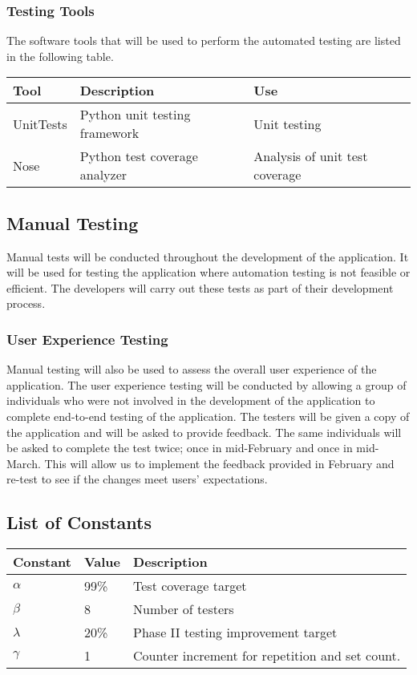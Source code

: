 \documentclass{article}
\begin{document}
\subsubsection{Testing Tools}
The software tools that will be used to perform the automated testing are listed in the following table.

\begingroup
\begin{tabular}{ | p{3cm} | p{5cm} | p{5cm} |} 
    \hline
    \textbf{Tool} & \textbf{Description} & \textbf{Use}\\
    \hline
    UnitTests & Python unit testing framework& Unit testing \\
    \hline
    Nose & Python test coverage analyzer & Analysis of unit test coverage\\
    \hline
\end{tabular}
\endgroup

\subsection{Manual Testing} 
Manual tests will be conducted throughout the development of the application. It will be used for testing the application where automation testing is not feasible or efficient. The developers will carry out these tests as part of their development process. 

\subsubsection{User Experience Testing} 
Manual testing will also be used to assess the overall user experience of the application. The user experience testing will be conducted by allowing a group of individuals who were not involved in the development of the application to complete end-to-end testing of the application. The testers will be given a copy of the application and will be asked to provide feedback. The same individuals will be asked to complete the test twice; once in mid-February and once in mid-March. This will allow us to implement the feedback provided in February and re-test to see if the changes meet users' expectations. 

\subsection{List of Constants} 
\begingroup
\begin{center}
\begin{tabular}{ | p{2cm} | p{2cm} | p{6cm} |} 
    \hline
    \textbf{Constant} & \textbf{Value} & \textbf{Description}\\
    \hline
    $\alpha$ & 99\% & Test coverage target \\
    \hline
    $\beta$ & 8 & Number of testers\\
    \hline
    $\lambda$ & 20\% & Phase II testing improvement target\\
    \hline
     $\gamma$ & 1 & Counter increment for repetition and set count.\\
    \hline
\end{tabular}
\end{center}
\endgroup
\end{document}
